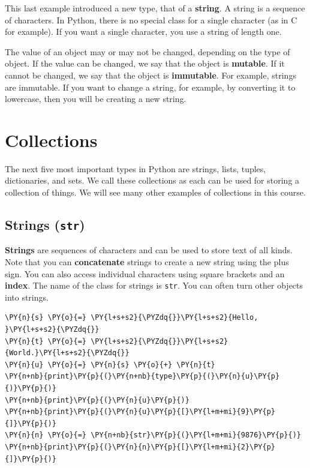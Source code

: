This last example introduced a new type, that of a \textbf{string}.  A string is a sequence of characters.  In Python, there is no special class for a single character (as in C for example).
If you want a single character, you use a string of length one.


The value of an object may or may not be changed, depending on the type of object.
If the value can be changed, we say that the object is \textbf{mutable}.
If it cannot be changed, we say that the object is \textbf{immutable}.
For example, strings are immutable.  If you want to change a string, for example, by converting it to lowercase, then you will be creating a new string.

\section{Collections}


The next five most important types in Python are strings, lists, tuples, dictionaries, and sets.  We call these collections as each can be used for storing a collection of things.  We will see many other examples of collections in this course.

\subsection{Strings  (\texttt{str})}


\textbf{Strings} are sequences of characters and can be used to store text of all kinds.  Note that you can \textbf{concatenate} strings to create a new string using the plus sign.  You can also access individual characters using square brackets and an \textbf{index}.  The name of the class for strings is \texttt{str}.  You can often turn other objects into strings.

\begin{Verbatim}[commandchars=\\\{\}]
\PY{n}{s} \PY{o}{=} \PY{l+s+s2}{\PYZdq{}}\PY{l+s+s2}{Hello, }\PY{l+s+s2}{\PYZdq{}}
\PY{n}{t} \PY{o}{=} \PY{l+s+s2}{\PYZdq{}}\PY{l+s+s2}{World.}\PY{l+s+s2}{\PYZdq{}}
\PY{n}{u} \PY{o}{=} \PY{n}{s} \PY{o}{+} \PY{n}{t}
\PY{n+nb}{print}\PY{p}{(}\PY{n+nb}{type}\PY{p}{(}\PY{n}{u}\PY{p}{)}\PY{p}{)}
\PY{n+nb}{print}\PY{p}{(}\PY{n}{u}\PY{p}{)}
\PY{n+nb}{print}\PY{p}{(}\PY{n}{u}\PY{p}{[}\PY{l+m+mi}{9}\PY{p}{]}\PY{p}{)}
\PY{n}{n} \PY{o}{=} \PY{n+nb}{str}\PY{p}{(}\PY{l+m+mi}{9876}\PY{p}{)}
\PY{n+nb}{print}\PY{p}{(}\PY{n}{n}\PY{p}{[}\PY{l+m+mi}{2}\PY{p}{]}\PY{p}{)}
\end{Verbatim}


